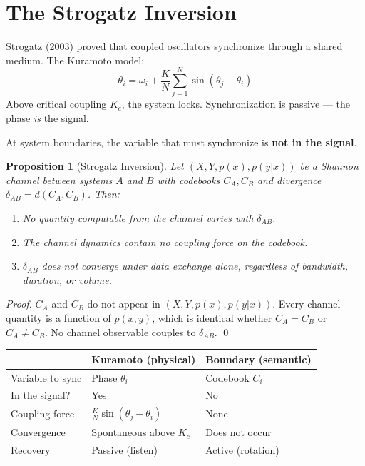 \documentclass[11pt,a4paper]{article}
\newtheorem{proposition}[theorem]{Proposition}
\begin{document}
\section{The Strogatz Inversion}
\label{sec:strogatz}

Strogatz (2003) proved that coupled oscillators synchronize 
through a shared medium. The Kuramoto model:
\[
\dot{\theta}_i = \omega_i + \frac{K}{N} \sum_{j=1}^{N} 
\sin(\theta_j - \theta_i)
\]
Above critical coupling $K_c$, the system locks. Synchronization 
is passive --- the phase \emph{is} the signal.

At system boundaries, the variable that must synchronize is 
\textbf{not in the signal}.

\begin{proposition}[Strogatz Inversion]
\label{prop:strogatz}
Let $(X, Y, p(x), p(y|x))$ be a Shannon channel between systems 
$A$ and $B$ with codebooks $C_A, C_B$ and divergence 
$\delta_{AB} = d(C_A, C_B)$. Then:
\begin{enumerate}[label=(\roman*)]
  \item No quantity computable from the channel varies with 
  $\delta_{AB}$.
  \item The channel dynamics contain no coupling force on the codebook.
  \item $\delta_{AB}$ does not converge under data exchange alone, 
  regardless of bandwidth, duration, or volume.
\end{enumerate}
\end{proposition}

\begin{proof}
$C_A$ and $C_B$ do not appear in $(X, Y, p(x), p(y|x))$. Every 
channel quantity is a function of $p(x,y)$, which is identical 
whether $C_A = C_B$ or $C_A \neq C_B$. No channel observable 
couples to $\delta_{AB}$. \qed
\end{proof}

\begin{center}\small
\begin{tabular}{@{}lll@{}}
\toprule
& \textbf{Kuramoto (physical)} & \textbf{Boundary (semantic)} \\
\midrule
Variable to sync & Phase $\theta_i$ & Codebook $C_i$ \\
In the signal? & Yes & No \\
Coupling force & $\frac{K}{N}\sin(\theta_j - \theta_i)$ & None \\
Convergence & Spontaneous above $K_c$ & Does not occur \\
Recovery & Passive (listen) & Active (rotation) \\
\bottomrule
\end{tabular}
\end{center}
\end{document}
